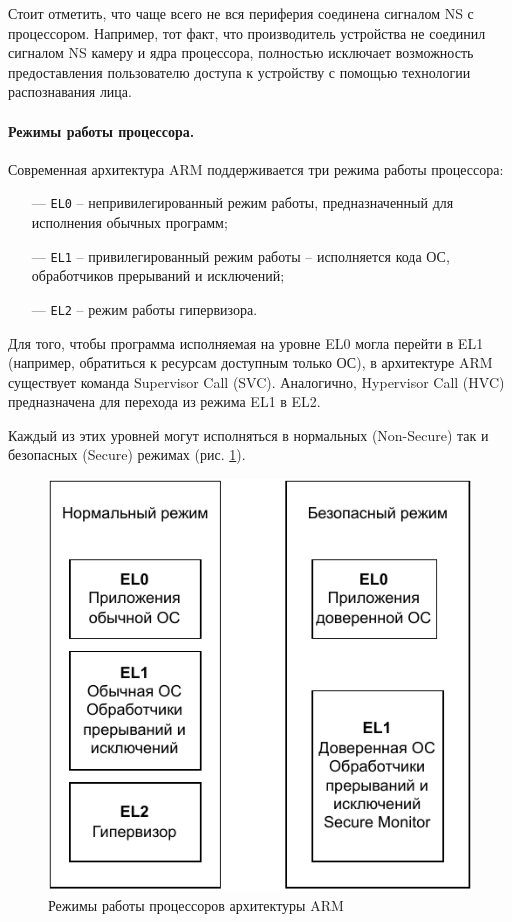 Стоит отметить, что чаще всего не вся периферия соединена сигналом NS с процессором. Например, тот факт, что производитель устройства не соединил сигналом NS камеру и ядра процессора, полностью исключает возможность предоставления пользователю доступа к устройству с помощью технологии распознавания лица.

\paragraph{Режимы работы процессора.}\label{arm-proc}

Современная архитектура ARM поддерживается три режима работы процессора: 

\begin{itemize}
	\item [---] \texttt{EL0} -- непривилегированный режим работы, предназначенный для исполнения обычных программ;
	\item [---] \texttt{EL1} -- привилегированный режим работы -- исполняется кода ОС, обработчиков прерываний и исключений;
	\item [---] \texttt{EL2} -- режим работы гипервизора.
\end{itemize}

Для того, чтобы программа исполняемая на уровне EL0 могла перейти в EL1 (например, обратиться к ресурсам доступным только ОС), в архитектуре ARM существует команда Supervisor Call (SVC). Аналогично, Hypervisor Call (HVC) предназначена для перехода из режима EL1 в EL2.

Каждый из этих уровней могут исполняться в нормальных (Non-Secure) так и безопасных (Secure) режимах (рис. \ref{fig:arm-levels}).

\begin{figure}[h]
	\centering
	\includegraphics[width=\textwidth]{img/arm-levels.pdf}
	\caption{Режимы работы процессоров архитектуры ARM}
	\label{fig:arm-levels}
\end{figure}

